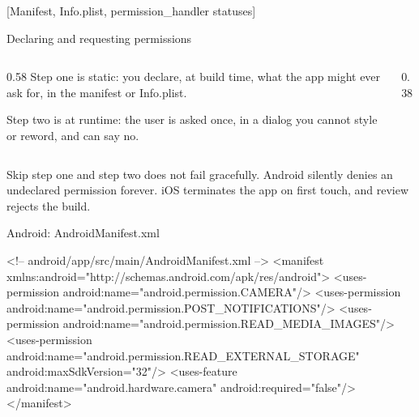 \documentclass[10pt,aspectratio=169,t]{beamer}
\begin{document}
[Manifest, Info.plist, permission\_handler statuses]

\begin{frame}[eyebrow=Permissions]{Declaring and requesting permissions}
  \begin{columns}[T]
    \begin{column}{0.58\textwidth}
      Step one is static: you declare, at build time, what the app might ever ask for, in the manifest or Info.plist.

      Step two is at runtime: the user is asked once, in a dialog you cannot style or reword, and can say no.
    \end{column}
    \begin{column}{0.38\textwidth}
    \end{column}
  \end{columns}
  \begin{takeaway}{Skip step one and step two does not fail gracefully.}
    Android silently denies an undeclared permission forever. iOS terminates the app on first touch, and review rejects the build.
  \end{takeaway}
\end{frame}

\begin{frame}[fragile,eyebrow=Permissions]{Android: AndroidManifest.xml}
\begin{codeblock}[language=XML]
<!-- android/app/src/main/AndroidManifest.xml -->
<manifest xmlns:android="http://schemas.android.com/apk/res/android">
  <uses-permission android:name="android.permission.CAMERA"/>
  <uses-permission android:name="android.permission.POST_NOTIFICATIONS"/>
  <uses-permission android:name="android.permission.READ_MEDIA_IMAGES"/>
  <uses-permission android:name="android.permission.READ_EXTERNAL_STORAGE"
                    android:maxSdkVersion="32"/>
  <uses-feature android:name="android.hardware.camera"
                android:required="false"/>
</manifest>
\end{codeblock}
\end{frame}
\end{document}
